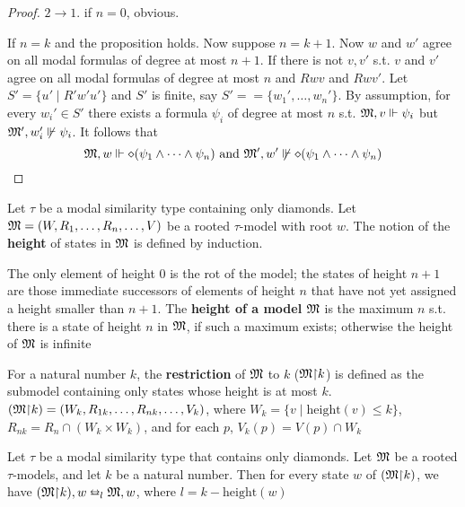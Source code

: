 \documentclass[11pt]{article}
\begin{document}
\begin{proof}
\(2\to 1\). if \(n=0\), obvious.

If \(n=k\) and the proposition holds. Now suppose \(n=k+1\). Now \(w\) and
\(w'\) agree on all modal formulas of degree at most \(n+1\). If
there is not \(v,v'\) s.t. \(v\) and \(v'\) agree on all modal formulas of
degree at most \(n\) and \(Rwv\) and \(Rwv'\). Let \(S'=\{u'\mid R'w'u'\}\)
and \(S'\) is finite, say \(S'==\{w_1',\dots,w_n'\}\). By assumption, for
every \(w_i'\in S'\) there exists a formula \(\psi_i\)  of degree at most
\(n\) s.t. \(\mathfrak{M},v\Vdash\psi_i\) but \(\mathfrak{M}',w_i'\not\Vdash\psi_i\). It
follows that
\begin{equation*}
\mathfrak{M},w\Vdash\diamond(\psi_1\wedge\dots\wedge\psi_n)
\text{ and }
\mathfrak{M}',w'\not\Vdash\diamond(\psi_1\wedge\dots\wedge\psi_n)
\end{equation*}
\end{proof}

\begin{definition}[]
Let \(\tau\) be a modal similarity type containing only diamonds. Let
\(\mathfrak{M}=(W,R_1,\dots,R_n,\dots,V)\) be a rooted \(\tau\)-model with root
\(w\). The notion of the \textbf{height} of states in \(\mathfrak{M}\) is defined by
induction.

The only element of height 0 is the rot of the model; the states of height
\(n+1\) are those immediate successors of elements of height \(n\) that have
not yet assigned a height smaller than \(n+1\). The \textbf{height of a model} \(\mathfrak{M}\)
is the maximum \(n\) s.t. there is a state of height \(n\) in \(\mathfrak{M}\), if
such a maximum exists; otherwise the height of \(\mathfrak{M}\) is infinite

For a natural number \(k\), the \textbf{restriction} of \(\mathfrak{M}\) to \(k\)
(\(\mathfrak{M}\mathord{\upharpoonright} k\)) is defined as the submodel containing only states
whose height is at most \(k\). \((\mathfrak{M}\mathord{\upharpoonright}
    k)=(W_k,R_{1k},\dots,R_{nk},\dots,V_k)\), where
\(W_k=\{v\mid\text{height}(v)\le k\}\), \(R_{nk}=R_n\cap(W_k\times W_k)\),
and for each \(p\), \(V_k(p)=V(p)\cap W_k\)
\end{definition}


\begin{lemma}[]
\label{lemma2.33}
Let \(\tau\) be a modal similarity type that contains only diamonds. Let \(\mathfrak{M}\) be
a rooted \(\tau\)-models, and let \(k\) be a natural number. Then for every
state \(w\) of \((\mathfrak{M}\mathord{\upharpoonright} k)\), we have \((\mathfrak{M}\mathord{\upharpoonright}
    k),w\leftrightarroweq_l\mathfrak{M},w\), where \(l=k-\text{height}(w)\)
\end{lemma}
\end{document}
